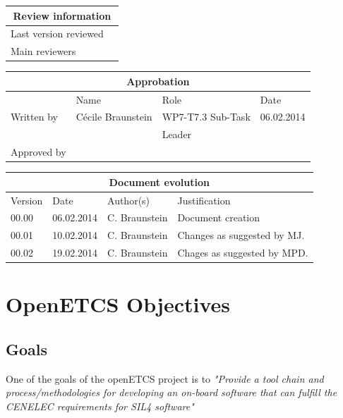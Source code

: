 \documentclass{openetcs_report}
\begin{document}
\begin{tabular}{|p{4.4cm}|p{8.7cm}|}
\hline
\multicolumn{2}{|c|}{Review information} \\
\hline
Last version reviewed &  \\
\hline
Main reviewers &  \\
\hline
\end{tabular}

\begin{tabular}{|p{2.2cm}|p{4cm}|p{4cm}|p{2cm}|}
\hline
\multicolumn{4}{|c|}{Approbation} \\
\hline
  &  Name & Role & Date   \\
\hline  
Written by    &  Cécile Braunstein & WP7-T7.3 Sub-Task  & 06.02.2014 \\
&  & Leader&\\
\hline
Approved by &  &   &  \\
\hline
\end{tabular}

\begin{tabular}{|p{2.2cm}|p{2cm}|p{3cm}|p{5cm}|}
\hline
\multicolumn{4}{|c|}{Document evolution} \\
\hline
Version &  Date & Author(s) & Justification  \\
\hline  
00.00 & 06.02.2014 & C. Braunstein  &  Document creation  \\
00.01 & 10.02.2014 & C. Braunstein  &  Changes as suggested by MJ.\\
00.02 & 19.02.2014 & C. Braunstein  &  Chages as suggested by MPD. \\



\hline  
\end{tabular}
\newpage


\mainmatter







\chapter{OpenETCS Objectives}
\label{chap-1}
\section{Goals}
\label{sec-1-1}
One of the goals of the openETCS project is to {\em "Provide a tool chain and process/methodologies for developing an on-board software that can fulfill the CENELEC requirements for SIL4 software"}
\end{document}
